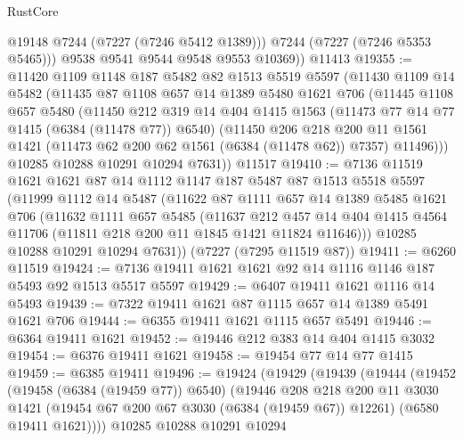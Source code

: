 \begin{lexlean}{RustCore}
\begin{coremodule}
            @19148
            @7244
            (@7227 (@7246 @5412 @1389)))
          @7244
          (@7227 (@7246 @5353 @5465)))
        @9538
        @9541
        @9544
        @9548
        @9553
        @10369))
    @11413
@19355 := @11420
    @1109
    @1148
    @187
    @5482
    @82
    @1513
    @5519
    @5597
    (@11430
      @1109
      @14
      @5482
      (@11435
        @87
        @1108
        @657
        @14
        @1389
        @5480
        @1621
        @706
        (@11445
          @1108
          @657
          @5480
          (@11450
            @212
            @319
            @14
            @404
            @1415
            @1563
            (@11473 @77 @14 @77 @1415 (@6384 (@11478 @77)) @6540)
            (@11450
              @206
              @218
              @200
              @11
              @1561
              @1421
              (@11473 @62 @200 @62 @1561 (@6384 (@11478 @62)) @7357)
              @11496)))
        @10285
        @10288
        @10291
        @10294
        @7631))
    @11517
@19410 := @7136
    @11519
    @1621
    @1621
    @87
    @14
    @1112
    @1147
    @187
    @5487
    @87
    @1513
    @5518
    @5597
    (@11999
      @1112
      @14
      @5487
      (@11622
        @87
        @1111
        @657
        @14
        @1389
        @5485
        @1621
        @706
        (@11632
          @1111
          @657
          @5485
          (@11637
            @212
            @457
            @14
            @404
            @1415
            @4564
            @11706
            (@11811 @218 @200 @11 @1845 @1421 @11824 @11646)))
        @10285
        @10288
        @10291
        @10294
        @7631))
    (@7227 (@7295 @11519 @87))
@19411 := @6260 @11519
@19424 := @7136 @19411 @1621 @1621 @92 @14 @1116 @1146 @187 @5493 @92 @1513 @5517 @5597
@19429 := @6407 @19411 @1621 @1116 @14 @5493
@19439 := @7322 @19411 @1621 @87 @1115 @657 @14 @1389 @5491 @1621 @706
@19444 := @6355 @19411 @1621 @1115 @657 @5491
@19446 := @6364 @19411 @1621
@19452 := @19446 @212 @383 @14 @404 @1415 @3032
@19454 := @6376 @19411 @1621
@19458 := @19454 @77 @14 @77 @1415
@19459 := @6385 @19411
@19496 := @19424
    (@19429
      (@19439
        (@19444
          (@19452
            (@19458 (@6384 (@19459 @77)) @6540)
            (@19446
              @208
              @218
              @200
              @11
              @3030
              @1421
              (@19454 @67 @200 @67 @3030 (@6384 (@19459 @67)) @12261)
              (@6580 @19411 @1621))))
        @10285
        @10288
        @10291
        @10294

\end{coremodule}
\end{lexlean}
